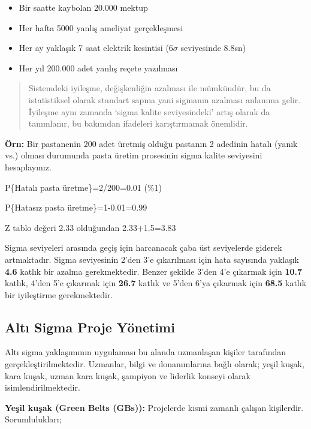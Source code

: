 \documentclass[
]{book}
\providecommand{\tightlist}{%
  \setlength{\itemsep}{0pt}\setlength{\parskip}{0pt}}
\begin{document}
\begin{itemize}
\tightlist
\item
  Bir saatte kaybolan 20.000 mektup
\item
  Her hafta 5000 yanlış ameliyat gerçekleşmesi
\item
  Her ay yaklaşık 7 saat elektrik kesintisi (6\(\sigma\) seviyesinde 8.8sn)
\item
  Her yıl 200.000 adet yanlış reçete yazılması
\end{itemize}

\begin{quote}
Sistemdeki iyileşme, değişkenliğin azalması ile mümkündür, bu da istatistiksel olarak standart sapma yani sigmanın azalması anlamına gelir. İyileşme aynı zamanda `sigma kalite seviyesindeki' artış olarak da tanımlanır, bu bakımdan ifadeleri karıştırmamak önemlidir.
\end{quote}

\textbf{Örn:} Bir pastanenin 200 adet üretmiş olduğu pastanın 2 adedinin hatalı (yanık vs.) olması durumunda pasta üretim prosesinin sigma kalite seviyesini hesaplayınız.

P\{Hatalı pasta üretme\}=2/200=0.01 (\%1)

P\{Hatasız pasta üretme\}=1-0.01=0.99

Z tablo değeri 2.33 olduğundan 2.33+1.5=3.83

Sigma seviyeleri arasında geçiş için harcanacak çaba üst seviyelerde giderek artmaktadır. Sigma seviyesinin 2'den 3'e çıkarılması için hata sayısında yaklaşık \textbf{4.6} katlık bir azalma gerekmektedir. Benzer şekilde 3'den 4'e çıkarmak için \textbf{10.7} katlık, 4'den 5'e çıkarmak için \textbf{26.7} katlık ve 5'den 6'ya çıkarmak için \textbf{68.5} katlık bir iyileştirme gerekmektedir.

\hypertarget{altux131-sigma-proje-yuxf6netimi}{%
\subsection{Altı Sigma Proje Yönetimi}\label{altux131-sigma-proje-yuxf6netimi}}

Altı sigma yaklaşımının uygulaması bu alanda uzmanlaşan kişiler tarafından gerçekleştirilmektedir. Uzmanlar, bilgi ve donanımlarına bağlı olarak; yeşil kuşak, kara kuşak, uzman kara kuşak, şampiyon ve liderlik konseyi olarak isimlendirilmektedir.

\textbf{Yeşil kuşak (Green Belts (GBs)):} Projelerde kısmi zamanlı çalışan kişilerdir. Sorumlulukları;
\end{document}
